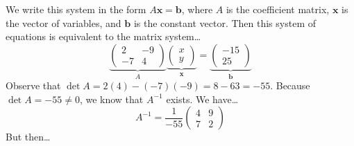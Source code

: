 \documentclass[11pt,letterpaper]{article}
\begin{document}
\sol We write this system in the form $A \mathbf{x}= \mathbf{b}$, where $A$ is the coefficient matrix, $\mathbf{x}$ is the vector of variables, and $\mathbf{b}$ is the constant vector. Then this system of equations is equivalent to the matrix system\dots
	\[
	\underbrace{
	\begin{pmatrix}
	2 & -9 \\
	-7 & 4
	\end{pmatrix}}_{A}
	\underbrace{\begin{pmatrix} x \\ y \end{pmatrix}}_{\mathbf{x}}= 
	\underbrace{\begin{pmatrix} -15 \\ 25 \end{pmatrix}}_{\mathbf{b}}
	\]
Observe that $\det A= 2(4) - (-7)(-9)= 8 - 63= -55$. Because $\det A= -55 \neq 0$, we know that $A^{-1}$ exists. We have\dots
	\[
	A^{-1}= \dfrac{1}{-55} \begin{pmatrix} 4 & 9 \\ 7 & 2 \end{pmatrix}
	\]
But then\dots
\end{document}
